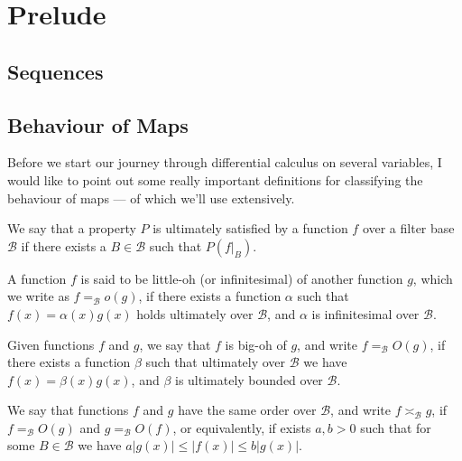 \section{Prelude}

\subsection{Sequences}


\subsection{Behaviour of Maps}

Before we start our journey through differential calculus on several variables,
I would like to point out some really important definitions for classifying the
behaviour of maps --- of which we'll use extensively.

\begin{definition}[Ultimately]
    We say that a property \(P\) is ultimately satisfied by a function \(f\) over
    a filter base \(\mathcal B\) if there exists a \(B \in \mathcal B\) such that
    \(P(f|_B)\).
\end{definition}

\begin{definition}[Little-oh]\label{def: little oh}
    A function \(f\) is said to be little-oh (or infinitesimal) of another
    function \(g\), which we write as \(f =_{\mathcal B} o(g)\), if there exists
    a function \(\alpha\) such that \(f(x) = \alpha(x) g(x)\) holds ultimately
    over \(\mathcal B\), and \(\alpha\) is infinitesimal over \(\mathcal B\).
\end{definition}

\begin{definition}[Big-oh]\label{def: big oh}
    Given functions \(f\) and \(g\), we say that \(f\) is big-oh of \(g\), and
    write \(f =_{\mathcal B} O(g)\), if there exists a function \(\beta\) such
    that ultimately over \(\mathcal B\) we have \(f(x) = \beta(x) g(x)\), and
    \(\beta\) is ultimately bounded over \(\mathcal B\).
\end{definition}

\begin{definition}\label{def: asymp-order}
    We say that functions \(f\) and \(g\) have the same order over \(\mathcal
    B\), and write \(f \asymp_{\mathcal B} g\), if \(f =_{\mathcal B} O(g)\) and
    \(g =_{\mathcal B} O(f)\), or equivalently, if exists \(a, b > 0\) such that
    for some \(B \in \mathcal B\) we have \(a |g(x)| \leq |f(x)| \leq b|g(x)|\).
\end{definition}

